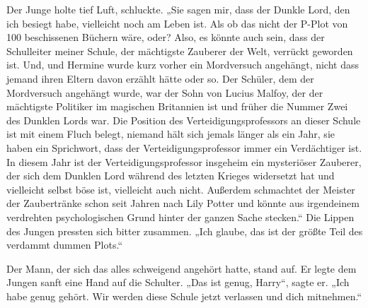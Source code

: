 Der Junge holte tief Luft, schluckte.
„Sie sagen mir, dass der Dunkle Lord, den ich besiegt habe, vielleicht noch am Leben ist. Als ob das nicht der P-Plot von 100 beschissenen Büchern wäre, oder? Also, es könnte auch sein, dass der Schulleiter meiner Schule, der mächtigste Zauberer der Welt, verrückt geworden ist. Und, und Hermine wurde kurz vorher ein Mordversuch angehängt, nicht dass jemand ihren Eltern davon erzählt hätte oder so. Der Schüler, dem der Mordversuch angehängt wurde, war der Sohn von Lucius Malfoy, der der mächtigste Politiker im magischen Britannien ist und früher die Nummer Zwei des Dunklen Lords war. Die Position des Verteidigungsprofessors an dieser Schule ist mit einem Fluch belegt, niemand hält sich jemals länger als ein Jahr, sie haben ein Sprichwort, dass der Verteidigungsprofessor immer ein Verdächtiger ist. In diesem Jahr ist der Verteidigungsprofessor insgeheim ein mysteriöser Zauberer, der sich dem Dunklen Lord während des letzten Krieges widersetzt hat und vielleicht selbst böse ist, vielleicht auch nicht. Außerdem schmachtet der Meister der Zaubertränke schon seit Jahren nach Lily Potter und könnte aus irgendeinem verdrehten psychologischen Grund hinter der ganzen Sache stecken.“
Die Lippen des Jungen pressten sich bitter zusammen.
„Ich glaube, das ist der größte Teil des verdammt dummen Plots.“

Der Mann, der sich das alles schweigend angehört hatte, stand auf. Er legte dem Jungen sanft eine Hand auf die Schulter.
„Das ist genug, Harry“, sagte er.
„Ich habe genug gehört. Wir werden diese Schule jetzt verlassen und dich mitnehmen.“

